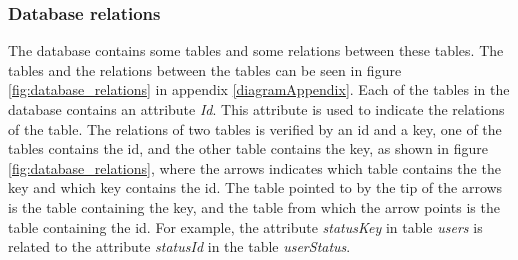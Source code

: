\subsubsection{Database relations}
The database contains some tables and some relations between these tables. The tables and the relations between the tables can be seen in figure \ref{fig:database_relations} in appendix \ref{diagramAppendix}.
Each of the tables in the database contains an attribute \textit{Id}. This attribute is used to indicate the relations of the table.
The relations of two tables  is verified by an id and a key, one of the tables contains the id, and the other table contains the key, as shown in figure \ref{fig:database_relations}, where the arrows indicates which table contains the the key and which key contains the id. The table pointed to by the tip of the arrows is the table containing the key, and the table from which the arrow points is the table containing the id. 
For example, the attribute  \textit{statusKey} in table \textit{users} is related to the attribute \textit{statusId} in the table \textit{userStatus}.